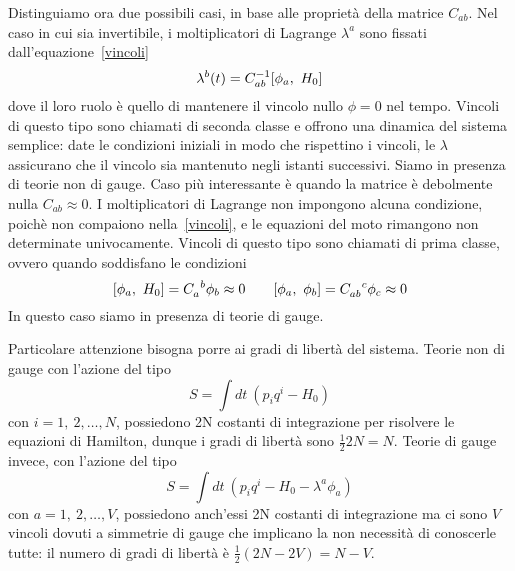     Distinguiamo ora due possibili casi, in base alle proprietà della matrice $C_{ab}$. 
    Nel caso in cui sia invertibile, i moltiplicatori di Lagrange $\lambda^a$ sono fissati dall'equazione~\eqref{vincoli}
    \begin{equation*}
        \lambda^b (t) = C^{-1}_{ab} [\phi_a, ~H_0]
    \end{equation*}
    dove il loro ruolo è quello di mantenere il vincolo nullo $\phi = 0$ nel tempo. Vincoli di questo tipo sono chiamati di seconda classe e offrono una dinamica del sistema semplice: date le condizioni iniziali in modo che rispettino i vincoli, le $\lambda$ assicurano che il vincolo sia mantenuto negli istanti successivi. Siamo in presenza di teorie non di gauge.
    Caso più interessante è quando la matrice è debolmente nulla $C_{ab} \approx 0$. I moltiplicatori di Lagrange non impongono alcuna condizione, poichè non compaiono nella~\eqref{vincoli}, e le equazioni del moto rimangono non determinate univocamente. Vincoli di questo tipo sono chiamati di prima classe, ovvero quando soddisfano le condizioni
    \begin{equation} \label{secondaclasse}
        \poi{\phi_a}{H_0} = C_a^{\phantom a b} \phi_b \approx 0 \qquad \poi{\phi_a}{\phi_b} = C_{ab}^{\phantom{ab} c} \phi_c \approx 0
    \end{equation}
    In questo caso siamo in presenza di teorie di gauge.
    
    \hfill 

    Particolare attenzione bisogna porre ai gradi di libertà del sistema. Teorie non di gauge con l'azione del tipo 
    \begin{equation*}
        S = \int dt ~ (p_i q^i - H_0)
    \end{equation*}
    con $i=1,~2, \ldots, N$, possiedono 2N costanti di integrazione per risolvere le equazioni di Hamilton, dunque i gradi di libertà sono $\frac{1}{2} 2N = N$. Teorie di gauge invece, con l'azione del tipo
    \begin{equation*}
        S = \int dt ~(p_i q^i - H_0 - \lambda^a \phi_a)
    \end{equation*}
    con $a=1,~2, \ldots, V$, possiedono anch'essi 2N costanti di integrazione ma ci sono $V$ vincoli dovuti a simmetrie di gauge che implicano la non necessità di conoscerle tutte: il numero di gradi di libertà è $\frac{1}{2} (2N - 2V) = N - V$.

